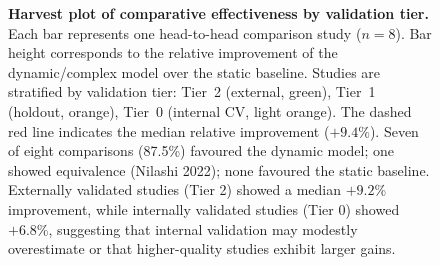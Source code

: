 \documentclass[11pt,a4paper]{article}
\begin{document}
\begin{figure}[H]
\caption{\textbf{Harvest plot of comparative effectiveness by validation tier.} Each bar represents one head-to-head comparison study ($n=8$). Bar height corresponds to the relative improvement of the dynamic/complex model over the static baseline. Studies are stratified by validation tier: Tier~2 (external, green), Tier~1 (holdout, orange), Tier~0 (internal CV, light orange). The dashed red line indicates the median relative improvement ($+9.4\%$). Seven of eight comparisons (87.5\%) favoured the dynamic model; one showed equivalence (Nilashi 2022); none favoured the static baseline. Externally validated studies (Tier 2) showed a median $+9.2\%$ improvement, while internally validated studies (Tier 0) showed $+6.8\%$, suggesting that internal validation may modestly overestimate or that higher-quality studies exhibit larger gains.}
\label{fig:s2_harvest}
\end{figure}
\end{document}
